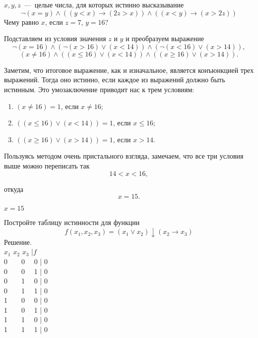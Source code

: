 
\setcounter{example}{0}

\begin{exercise}
	$x, y, z$~---~целые числа, для которых истинно высказывание
\begin{equation}
		\neg(x=y)\wedge((y<x)\rightarrow(2z>x))\wedge((x<y)\rightarrow(x>2z))
		\label{true_eq}
\end{equation}
	Чему равно $x$, если $z=7$, $y=16$?
\end{exercise}

\begin{solution}
	Подставляем из условия значения $z$ и $y$ и преобразуем выражение 
	$$
		\neg(x=16)\wedge(\neg(x>16)\vee(x<14))\wedge(\neg(x<16)\vee(x>14)),
	$$
	$$
		(x\neq16)\wedge((x\leqslant16)\vee(x<14))\wedge((x\geqslant16)\vee(x>14)).
	$$
	
	Заметим, что итоговое выражение, как и изначальное, является конъюнкцией
	трех выражений. Тогда оно истинно, если каждое из выражений должно быть
	истинным. Это умозаключение приводит нас к трем условиям:
\begin{enumerate}
	\item $(x\neq16)=1$, если $x\neq16$;
	\item $((x\leqslant16)\vee(x<14))=1$, если $x\leqslant16$;
	\item $((x\geqslant16)\vee(x>14))=1$, если $x>14$.
\end{enumerate}
	
	Пользуясь методом очень пристального взгляда, замечаем, что
	все три условия выше можно переписать так
	$$14<x<16,$$

	\noindent откуда
	$$x=15.$$
\end{solution}

\begin{answer}
	$x=15$
\end{answer}

\begin{exercise}
Постройте таблицу истинности для функции
$$f(x_1,x_2,x_3)=(x_1\vee x_2)\downarrow(x_2\rightarrow x_3)$$
Решение.\\
$x_1$ $x_2$ $x_3$ |$f$\\
0\ \ \ \  0 \ \   0 | 0\\
0\ \ \ \  0 \ \   1 | 0\\
0\ \ \ \  1 \ \   0 | 0\\
0\ \ \ \  1 \ \   1 | 0\\
1\ \ \ \  0 \ \   0 | 0\\
1\ \ \ \  0 \ \   1 | 0\\
1\ \ \ \  1 \ \   0 | 0\\
1\ \ \ \  1 \ \   1 | 0\\
\end{exercise}

